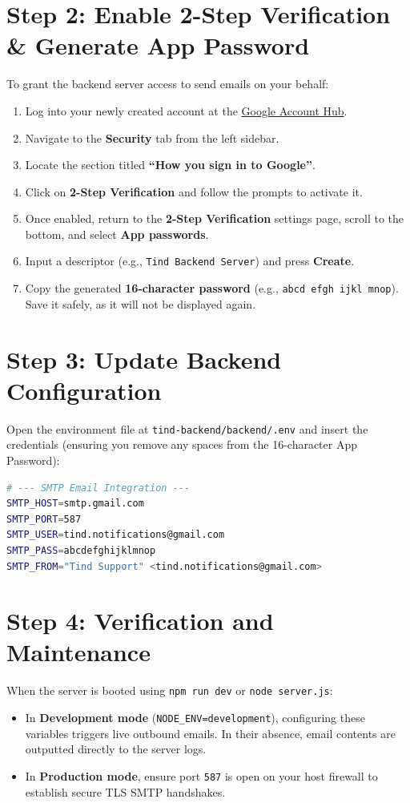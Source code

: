 \documentclass[11pt,a4paper]{article}
\begin{document}
\section{Step 2: Enable 2-Step Verification \& Generate App Password}
\label{sec:app-password}
To grant the backend server access to send emails on your behalf:
\begin{enumerate}
    \item Log into your newly created account at the \href{https://myaccount.google.com/}{Google Account Hub}.
    \item Navigate to the \textbf{Security} tab from the left sidebar.
    \item Locate the section titled \textbf{``How you sign in to Google''}.
    \item Click on \textbf{2-Step Verification} and follow the prompts to activate it.
    \item Once enabled, return to the \textbf{2-Step Verification} settings page, scroll to the bottom, and select \textbf{App passwords}.
    \item Input a descriptor (e.g., \texttt{Tind Backend Server}) and press \textbf{Create}.
    \item Copy the generated \textbf{16-character password} (e.g., \texttt{abcd efgh ijkl mnop}). Save it safely, as it will not be displayed again.
\end{enumerate}

\section{Step 3: Update Backend Configuration}
Open the environment file at \texttt{tind-backend/backend/.env} and insert the credentials (ensuring you remove any spaces from the 16-character App Password):

\begin{lstlisting}[language=bash]
# --- SMTP Email Integration ---
SMTP_HOST=smtp.gmail.com
SMTP_PORT=587
SMTP_USER=tind.notifications@gmail.com
SMTP_PASS=abcdefghijklmnop
SMTP_FROM="Tind Support" <tind.notifications@gmail.com>
\end{lstlisting}

\section{Step 4: Verification and Maintenance}
When the server is booted using \texttt{npm run dev} or \texttt{node server.js}:
\begin{itemize}
    \item In \textbf{Development mode} (\texttt{NODE\_ENV=development}), configuring these variables triggers live outbound emails. In their absence, email contents are outputted directly to the server logs.
    \item In \textbf{Production mode}, ensure port \texttt{587} is open on your host firewall to establish secure TLS SMTP handshakes.
\end{itemize}
\end{document}
